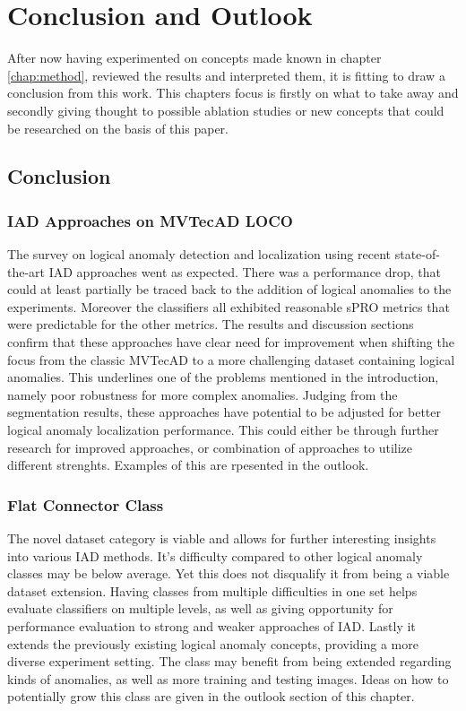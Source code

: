 \chapter{Conclusion and Outlook}
\label{chap:conclusion}


After now having experimented on concepts made known in chapter \ref{chap:method}, reviewed the results and interpreted them, it is 
fitting to draw a conclusion from this work. This chapters focus is firstly on what to take away and secondly giving thought to 
possible ablation studies or new concepts that could be researched on the basis of this paper.


\section{Conclusion}
\label{sec:realconclusion}

\subsection{IAD Approaches on MVTecAD LOCO}
The survey on logical anomaly detection and localization using recent state-of-the-art IAD approaches went as expected. There was a performance drop, that could at least 
partially be traced back to the addition of logical anomalies to the experiments. Moreover the classifiers all exhibited reasonable sPRO metrics that were predictable for the 
other metrics. The results and discussion sections confirm that these approaches have clear need for improvement when shifting the focus from the classic MVTecAD \cite{MVTEC_Bergmann_2021} 
to a more challenging dataset containing logical anomalies. This underlines one of the problems mentioned in the introduction, namely poor robustness for more complex anomalies. \newline
Judging from the segmentation results, these approaches have potential to be adjusted for better logical anomaly localization performance. This could either be through 
further research for improved approaches, or combination of approaches to utilize different strenghts. Examples of this are rpesented in the outlook.

\subsection{Flat Connector Class}
The novel dataset category is viable and allows for further interesting insights into various IAD methods. It's difficulty compared to other logical anomaly classes may be 
below average. Yet this does not disqualify it from being a viable dataset extension. Having classes from multiple difficulties in one set helps evaluate classifiers on 
multiple levels, as well as giving opportunity for performance evaluation to strong and weaker approaches of IAD. Lastly it extends the previously existing logical anomaly 
concepts, providing a more diverse experiment setting. \newline
The class may benefit from being extended regarding kinds of anomalies, as well as more training and testing images. Ideas on how to potentially grow this class are given 
in the outlook section of this chapter.

